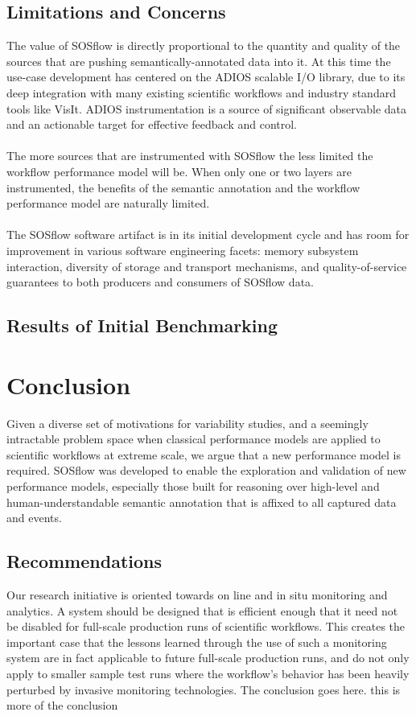 \subsection{Limitations and Concerns}
The value of SOSflow is directly proportional to the quantity and quality of the 
sources that are pushing semantically-annotated data into it. At this time the 
use-case development has centered on the ADIOS scalable I/O library, due to its 
deep integration with many existing scientific workflows and industry standard 
tools  like VisIt. ADIOS instrumentation is a source of significant
observable data and an actionable target for effective feedback and control.\\
\\
The more sources that are instrumented with SOSflow the less limited the workflow 
performance model will be. When only one or two layers are instrumented, the 
benefits of the semantic annotation and the workflow performance model are 
naturally limited.\\
\\
The SOSflow software artifact is in its initial development cycle and has room 
for improvement in various software engineering facets:  
memory subsystem interaction, diversity of storage and transport mechanisms, 
and quality-of-service guarantees to both producers and consumers of 
SOSflow data.
\subsection{Results of Initial Benchmarking}
\section{Conclusion}
Given a diverse set of motivations for variability studies, and a seemingly 
intractable problem space when classical performance models are applied to 
scientific workflows at extreme scale, we argue that a new performance model is 
required. SOSflow was developed to enable the exploration and validation of new 
performance models, especially those built for reasoning over high-level and 
human-understandable semantic annotation that is affixed to all captured data and 
events.
\subsection{Recommendations}
Our research initiative is oriented towards on line and in 
situ monitoring and  analytics. A system should be designed that is efficient 
enough that it need not 
be disabled for full-scale production runs of scientific workflows. This creates 
the important case that the lessons learned through the use of such a 
monitoring system are in fact applicable to future full-scale production runs, 
and do not only apply to smaller sample test runs where the workflow's behavior 
has been heavily perturbed by invasive monitoring technologies.
The conclusion goes here. this is more of the conclusion
